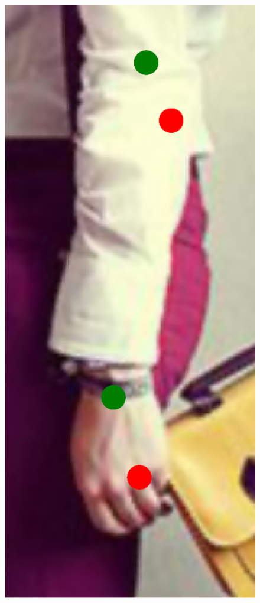 \begin{figure}[!t]
    \includegraphics[height=\fh]{resources/Fixing/fix_10}
    \hfill

\end{figure}
